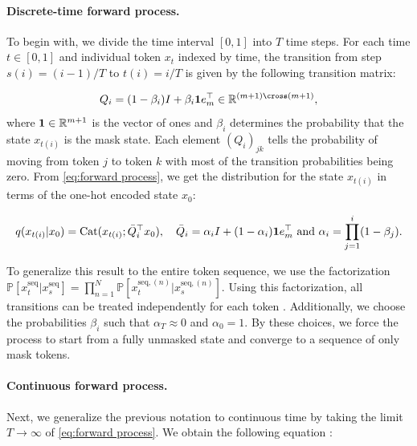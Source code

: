 \paragraph{Discrete-time forward process.}

To begin with, we divide the time interval $[0, 1]$ into $T$ time steps. For each time $t\in[0, 1]$ and individual token $x_t$ indexed by time, the transition from step $s(i) = (i - 1) / T$ to $t(i) = i / T$ is given by the following transition matrix:

\begin{equation}
    Q_i = (1 - \beta_i) I + \beta_i\bold{1}e_m^\top\in\mathbb{R}^{(m + 1)\cross(m + 1)},
    \label{eq:forward process}
\end{equation}
where $\bold{1}\in\mathbb{R}^{m + 1}$ is the vector of ones and $\beta_i$ determines the probability that the state $x_{t(i)}$ is the mask state. Each element $(Q_i)_{jk}$ tells the probability of moving from token $j$ to token $k$ with most of the transition probabilities being zero. From \eqref{eq:forward process}, we get the distribution for the state $x_{t(i)}$ in terms of the one-hot encoded state $x_0$:

\begin{equation*}
    q(x_{t(i)} | x_0) = \text{Cat}(x_{t(i)}; \bar{Q}_i^\top x_0), \quad\bar{Q}_i = \alpha_i I + (1 - \alpha_i)\bold{1}e_m^\top \text{ and } \alpha_i = \prod_{j=1}^{i}(1 - \beta_j).
\end{equation*}

To generalize this result to the entire token sequence, we use the factorization $\mathbb{P}[x_t^\text{seq} | x_s^\text{seq}] = \prod_{n=1}^{N}\mathbb{P}[x_t^{\text{seq},(n)} | x_s^{\text{seq},(n)}]$. Using this factorization, all transitions can be treated independently for each token \cite{shi2025simplifiedgeneralizedmaskeddiffusion}. Additionally, we choose the probabilities $\beta_i$ such that $\alpha_T\approx 0$ and $\alpha_0 = 1$. By these choices, we force the process to start from a fully unmasked state and converge to a sequence of only mask tokens.


\paragraph{Continuous forward process.}

Next, we generalize the previous notation to continuous time by taking the limit $T\rightarrow\infty$ of \eqref{eq:forward process}. We obtain the following equation \cite{austin2021structureddenoisingdiffusionmodels, shi2025simplifiedgeneralizedmaskeddiffusion}:

